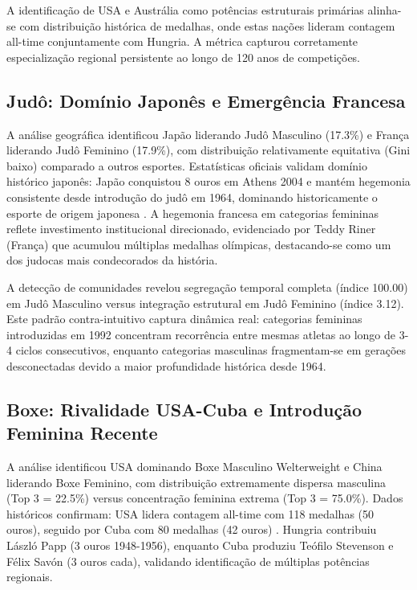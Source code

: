 A identificação de USA e Austrália como potências estruturais primárias alinha-se com distribuição histórica de medalhas, onde estas nações lideram contagem all-time conjuntamente com Hungria. A métrica capturou corretamente especialização regional persistente ao longo de 120 anos de competições.

\subsection{Judô: Domínio Japonês e Emergência Francesa}

A análise geográfica identificou Japão liderando Judô Masculino (17.3\%) e França liderando Judô Feminino (17.9\%), com distribuição relativamente equitativa (Gini baixo) comparado a outros esportes. Estatísticas oficiais validam domínio histórico japonês: Japão conquistou 8 ouros em Athens 2004 e mantém hegemonia consistente desde introdução do judô em 1964, dominando historicamente o esporte de origem japonesa \cite{NBCJudoHistory2024}. A hegemonia francesa em categorias femininas reflete investimento institucional direcionado, evidenciado por Teddy Riner (França) que acumulou múltiplas medalhas olímpicas, destacando-se como um dos judocas mais condecorados da história.

A detecção de comunidades revelou segregação temporal completa (índice 100.00) em Judô Masculino versus integração estrutural em Judô Feminino (índice 3.12). Este padrão contra-intuitivo captura dinâmica real: categorias femininas introduzidas em 1992 concentram recorrência entre mesmas atletas ao longo de 3-4 ciclos consecutivos, enquanto categorias masculinas fragmentam-se em gerações desconectadas devido a maior profundidade histórica desde 1964.

\subsection{Boxe: Rivalidade USA-Cuba e Introdução Feminina Recente}

A análise identificou USA dominando Boxe Masculino Welterweight e China liderando Boxe Feminino, com distribuição extremamente dispersa masculina (Top 3 = 22.5\%) versus concentração feminina extrema (Top 3 = 75.0\%). Dados históricos confirmam: USA lidera contagem all-time com 118 medalhas (50 ouros), seguido por Cuba com 80 medalhas (42 ouros) \cite{StatistaBoxingMedals2024}. Hungria contribuiu László Papp (3 ouros 1948-1956), enquanto Cuba produziu Teófilo Stevenson e Félix Savón (3 ouros cada), validando identificação de múltiplas potências regionais.

